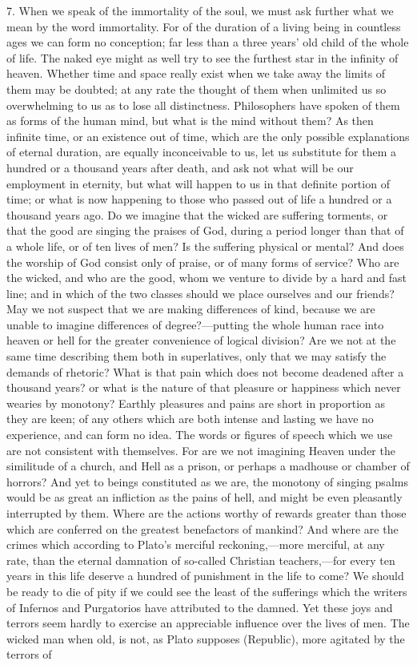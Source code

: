 \documentclass[11pt,letter]{article}
\begin{document}
\par  7. When we speak of the immortality of the soul, we must ask further what we mean by the word immortality. For of the duration of a living being in countless ages we can form no conception; far less than a three years' old child of the whole of life. The naked eye might as well try to see the furthest star in the infinity of heaven. Whether time and space really exist when we take away the limits of them may be doubted; at any rate the thought of them when unlimited us so overwhelming to us as to lose all distinctness. Philosophers have spoken of them as forms of the human mind, but what is the mind without them? As then infinite time, or an existence out of time, which are the only possible explanations of eternal duration, are equally inconceivable to us, let us substitute for them a hundred or a thousand years after death, and ask not what will be our employment in eternity, but what will happen to us in that definite portion of time; or what is now happening to those who passed out of life a hundred or a thousand years ago. Do we imagine that the wicked are suffering torments, or that the good are singing the praises of God, during a period longer than that of a whole life, or of ten lives of men? Is the suffering physical or mental? And does the worship of God consist only of praise, or of many forms of service? Who are the wicked, and who are the good, whom we venture to divide by a hard and fast line; and in which of the two classes should we place ourselves and our friends? May we not suspect that we are making differences of kind, because we are unable to imagine differences of degree?—putting the whole human race into heaven or hell for the greater convenience of logical division? Are we not at the same time describing them both in superlatives, only that we may satisfy the demands of rhetoric? What is that pain which does not become deadened after a thousand years? or what is the nature of that pleasure or happiness which never wearies by monotony? Earthly pleasures and pains are short in proportion as they are keen; of any others which are both intense and lasting we have no experience, and can form no idea. The words or figures of speech which we use are not consistent with themselves. For are we not imagining Heaven under the similitude of a church, and Hell as a prison, or perhaps a madhouse or chamber of horrors? And yet to beings constituted as we are, the monotony of singing psalms would be as great an infliction as the pains of hell, and might be even pleasantly interrupted by them. Where are the actions worthy of rewards greater than those which are conferred on the greatest benefactors of mankind? And where are the crimes which according to Plato's merciful reckoning,—more merciful, at any rate, than the eternal damnation of so-called Christian teachers,—for every ten years in this life deserve a hundred of punishment in the life to come? We should be ready to die of pity if we could see the least of the sufferings which the writers of Infernos and Purgatorios have attributed to the damned. Yet these joys and terrors seem hardly to exercise an appreciable influence over the lives of men. The wicked man when old, is not, as Plato supposes (Republic), more agitated by the terrors of 
\end{document}
